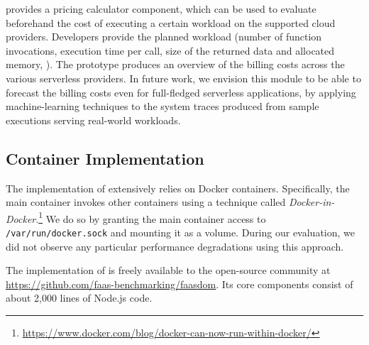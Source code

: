 \sys provides a pricing calculator component, which can be used to evaluate beforehand the cost of executing a certain workload on the supported cloud providers. 
Developers provide the planned workload (\eg number of function invocations, execution time per call, size of the returned data and allocated memory, \etc).
The \sys prototype produces an overview of the billing costs across the various serverless providers.
In future work, we envision this module to be able to forecast the billing costs even for full-fledged serverless applications, by applying machine-learning techniques to the system traces produced from sample executions serving real-world workloads.

\subsection{Container Implementation}
\label{ssec:impl}

The implementation of \sys extensively relies on Docker containers.
Specifically, the main container invokes other containers using a technique called \emph{Docker-in-Docker}.\footnote{\url{https://www.docker.com/blog/docker-can-now-run-within-docker/}}
We do so by granting the main container access to \texttt{/var/run/docker.sock} and mounting it as a volume.
During our evaluation, we did not observe any particular performance degradations using this approach.

The implementation of \sys is freely available to the open-source community at \url{https://github.com/faas-benchmarking/faasdom}.
Its core components consist of about 2,000 lines of Node.js code.